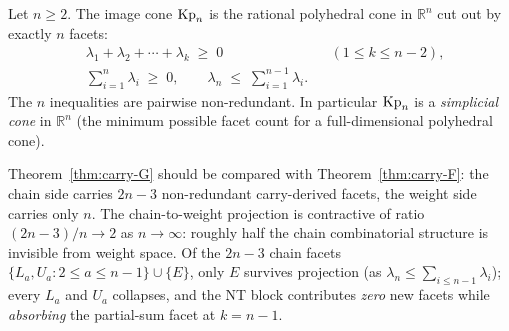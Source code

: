 \begin{theorem}\label{thm:carry-G}
Let $n \ge 2$. The image cone $\mathrm{Kp}_n$ is the rational polyhedral cone in
$\mathbb{R}^n$ cut out by exactly $n$ facets:
\begin{equation}
\begin{aligned}
   &\lambda_1 + \lambda_2 + \cdots + \lambda_k \;\ge\; 0
   && (1 \le k \le n - 2),\\
   &\sum_{i=1}^{n} \lambda_i \;\ge\; 0, \qquad
   \lambda_n \;\le\; \sum_{i=1}^{n-1} \lambda_i.
\end{aligned}\label{eq:carry-G}
\end{equation}
The $n$ inequalities are pairwise non-redundant. In particular $\mathrm{Kp}_n$ is a
\emph{simplicial cone} in $\mathbb{R}^n$ (the minimum possible facet count for a
full-dimensional polyhedral cone).
\end{theorem}

Theorem~\ref{thm:carry-G} should be compared with Theorem~\ref{thm:carry-F}:
the chain side carries $2n - 3$ non-redundant carry-derived facets, the
weight side carries only $n$. The chain-to-weight projection is contractive of
ratio $(2n - 3)/n \to 2$ as $n \to \infty$: roughly half the chain
combinatorial structure is invisible from weight space. Of the $2n - 3$ chain
facets $\{L_a, U_a : 2 \le a \le n-1\} \cup \{E\}$, only $E$ survives
projection (as $\lambda_n \le \sum_{i \le n-1} \lambda_i$); every $L_a$ and
$U_a$ collapses, and the NT block contributes \emph{zero} new facets while
\emph{absorbing} the partial-sum facet at $k = n - 1$.

